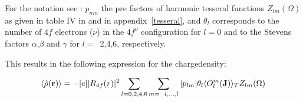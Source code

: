 For the notation see \cite{hutchings64-227}:
 $p_{nm}$ the pre factors of harmonic tesseral
functions $Z_{lm}(\Omega)$ as given in table IV in \cite{hutchings64-227} and in appendix~\ref{tesseral},
 and $\theta_l$
corresponds to the number of $4f$ electrons ($\nu$) in the
$4f^{\nu}$ configuration for $l=0$ and to
 the Stevens factors $\alpha$,$\beta$ and $\gamma$ for $l=$~2,4,6, respectively.

This results in the following expression for the chargedensity:
		  
  \begin{equation}\label{chargedensity_operator2}
	       \langle \hat\rho(\mathbf r)\rangle=-|e||R_{4f}(r)|^2 \sum_{l=0,2,4,6}\sum_{m=-l,...,l}
	         |p_{lm}| \theta_{l} \langle O_l^m(\mathbf J)\rangle_T Z_{lm}(\Omega)
	      \end{equation} 

  
